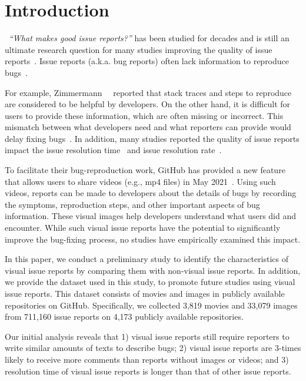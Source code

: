 \section{Introduction}
\label{sec:intro}
~{\it ``What makes good issue reports?''} has been studied for decades and is still an ultimate research question for many studies improving the quality of issue reports~\citep{TODO}. Issue reports (a.k.a. bug reports) often lack information to reproduce bugs~\citep{DBLP:conf/msr/JoorabchiMM14}\citep{DearGitHub}. 

For example, Zimmermann~\et~\citep{zimmermann2010TSE} reported  that  stack traces and steps to reproduce are considered to be helpful by developers. On the other hand, it is difficult for users to provide these information, which are often missing or incorrect. 
This mismatch between what developers need and what reporters can provide would delay fixing bugs~\citep{DBLP:conf/msr/JoorabchiMM14}. In addition, many studies reported the quality of issue reports impact the issue resolution time~\citep{DBLP:conf/cscw/BreuPSZ10}\citep{DBLP:conf/icse/GuoZNM10} and issue resolution rate~\citep{DBLP:conf/compsac/ZouXZCL15}\citep{DBLP:conf/icse/ZimmermannNGM12}. 

To facilitate their bug-reproduction work, GitHub has provided a new feature that allows users to share videos (e.g., mp4 files) in May 2021~\citep{github-video-blog}. Using such videos, reports can be made to developers about the details of bugs by recording the symptoms, reproduction steps, and other important aspects of bug information. These visual images help developers understand what users did and encounter. While such visual issue reports have the potential to significantly improve the bug-fixing process, no studies have empirically examined this impact. 

In this paper, we conduct a preliminary study to identify the characteristics of visual issue reports by comparing them with non-visual issue reports.  In addition, we provide the dataset used in this study, to promote future studies using visual issue reports. This dataset consists of movies and images in publicly available repositories on GitHub. Specifically, we collected 3,819 movies and 33,079 images from 711,160 issue reports on 4,173 publicly available repositories.


Our initial analysis reveals that 1) visual issue reports still require reporters to write similar amounts of texts to describe bugs; 2) visual issue reports are 3-times likely to receive more comments than reports without images or videos; and 3) resolution time of visual issue reports is longer than that of other issue reports. 
